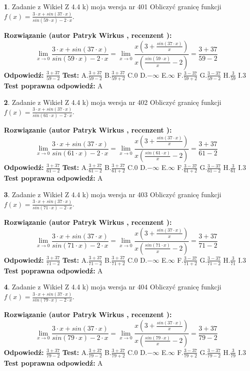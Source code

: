 \documentclass[12pt, a4paper]{article}
\theoremstyle{definition} %
\newtheorem{zad}{}
\newcommand{\zadStart}[1]{\begin{zad}#1\newline}
\newcommand{\zadStop}{\end{zad}}
\newcommand{\rozwStart}[2]{\noindent \textbf{Rozwiązanie (autor #1 , recenzent #2): }\newline}
\newcommand{\rozwStop}{\newline}
\newcommand{\odpStart}{\noindent \textbf{Odpowiedź:}\newline}
\newcommand{\odpStop}{\newline}
\newcommand{\testStart}{\noindent \textbf{Test:}\newline}
\newcommand{\testStop}{\newline}
\newcommand{\kluczStart}{\noindent \textbf{Test poprawna odpowiedź:}\newline}
\newcommand{\kluczStop}{\newline}
\begin{document}
\zadStart{Zadanie z Wikieł Z 4.4 k) moja wersja nr 401}
Obliczyć granicę funkcji $f(x)=\frac{3\cdot x +sin(37\cdot x)}{sin(59\cdot x) -2\cdot x}$.
\zadStop
\rozwStart{Patryk Wirkus}{}
$$\lim\limits_{x\to 0}\frac{3\cdot x +sin(37\cdot x)}{sin(59\cdot x) -2\cdot x}
=\lim\limits_{x\to 0}\frac{x(3+\frac{sin(37\cdot x)}{x})}{x(\frac{sin(59\cdot x)}{x}-2)}
=\frac{3+37}{59-2}$$
\rozwStop
\odpStart
$\frac{3+37}{59-2}$
\odpStop
\testStart
A.$\frac{3+37}{59-2}$
B.$\frac{3+37}{59+2}$
C.$0$
D.$-\infty$
E.$\infty$
F.$\frac{3-37}{59+2}$
G.$\frac{3-37}{59-2}$
H.$\frac{3}{59}$
I.$3$
\testStop
\kluczStart
A
\kluczStop



\zadStart{Zadanie z Wikieł Z 4.4 k) moja wersja nr 402}
Obliczyć granicę funkcji $f(x)=\frac{3\cdot x +sin(37\cdot x)}{sin(61\cdot x) -2\cdot x}$.
\zadStop
\rozwStart{Patryk Wirkus}{}
$$\lim\limits_{x\to 0}\frac{3\cdot x +sin(37\cdot x)}{sin(61\cdot x) -2\cdot x}
=\lim\limits_{x\to 0}\frac{x(3+\frac{sin(37\cdot x)}{x})}{x(\frac{sin(61\cdot x)}{x}-2)}
=\frac{3+37}{61-2}$$
\rozwStop
\odpStart
$\frac{3+37}{61-2}$
\odpStop
\testStart
A.$\frac{3+37}{61-2}$
B.$\frac{3+37}{61+2}$
C.$0$
D.$-\infty$
E.$\infty$
F.$\frac{3-37}{61+2}$
G.$\frac{3-37}{61-2}$
H.$\frac{3}{61}$
I.$3$
\testStop
\kluczStart
A
\kluczStop



\zadStart{Zadanie z Wikieł Z 4.4 k) moja wersja nr 403}
Obliczyć granicę funkcji $f(x)=\frac{3\cdot x +sin(37\cdot x)}{sin(71\cdot x) -2\cdot x}$.
\zadStop
\rozwStart{Patryk Wirkus}{}
$$\lim\limits_{x\to 0}\frac{3\cdot x +sin(37\cdot x)}{sin(71\cdot x) -2\cdot x}
=\lim\limits_{x\to 0}\frac{x(3+\frac{sin(37\cdot x)}{x})}{x(\frac{sin(71\cdot x)}{x}-2)}
=\frac{3+37}{71-2}$$
\rozwStop
\odpStart
$\frac{3+37}{71-2}$
\odpStop
\testStart
A.$\frac{3+37}{71-2}$
B.$\frac{3+37}{71+2}$
C.$0$
D.$-\infty$
E.$\infty$
F.$\frac{3-37}{71+2}$
G.$\frac{3-37}{71-2}$
H.$\frac{3}{71}$
I.$3$
\testStop
\kluczStart
A
\kluczStop



\zadStart{Zadanie z Wikieł Z 4.4 k) moja wersja nr 404}
Obliczyć granicę funkcji $f(x)=\frac{3\cdot x +sin(37\cdot x)}{sin(79\cdot x) -2\cdot x}$.
\zadStop
\rozwStart{Patryk Wirkus}{}
$$\lim\limits_{x\to 0}\frac{3\cdot x +sin(37\cdot x)}{sin(79\cdot x) -2\cdot x}
=\lim\limits_{x\to 0}\frac{x(3+\frac{sin(37\cdot x)}{x})}{x(\frac{sin(79\cdot x)}{x}-2)}
=\frac{3+37}{79-2}$$
\rozwStop
\odpStart
$\frac{3+37}{79-2}$
\odpStop
\testStart
A.$\frac{3+37}{79-2}$
B.$\frac{3+37}{79+2}$
C.$0$
D.$-\infty$
E.$\infty$
F.$\frac{3-37}{79+2}$
G.$\frac{3-37}{79-2}$
H.$\frac{3}{79}$
I.$3$
\testStop
\kluczStart
A
\kluczStop
\end{document}
